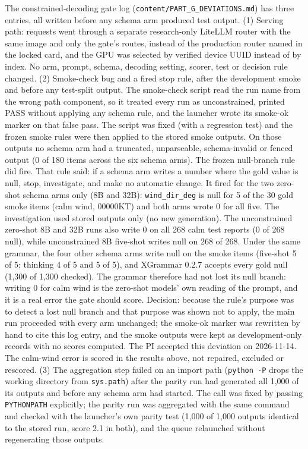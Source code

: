 \documentclass[11pt]{article}
\begin{document}
The constrained-decoding gate log (\texttt{content/PART\_G\_DEVIATIONS.md}) has three entries, all written before any
schema arm produced test output. (1) Serving path: requests went through a separate research-only LiteLLM router with
the same image and only the gate's routes, instead of the production router named in the locked card, and the GPU was
selected by verified device UUID instead of by index. No arm, prompt, schema, decoding setting, scorer, test or
decision rule changed.
(2) Smoke-check bug and a fired stop rule, after the development smoke and before any test-split output. The
smoke-check script read the run name from the wrong path component, so it treated every run as unconstrained, printed
PASS without applying any schema rule, and the launcher wrote its smoke-ok marker on that false pass. The script was
fixed (with a regression test) and the frozen smoke rules were then applied to the stored smoke outputs. On those
outputs no schema arm had a truncated, unparseable, schema-invalid or fenced output (0 of 180 items across the six
schema arms). The frozen null-branch rule did fire. That rule said: if a schema arm writes a number where the gold
value is null, stop, investigate, and make no automatic change. It fired for the two zero-shot schema arms only
(8B and 32B): \texttt{wind\_dir\_deg} is null for 5 of the 30 gold smoke items (calm wind, 00000KT) and both arms wrote
0 for all five. The investigation used stored outputs only (no new generation). The unconstrained zero-shot 8B and
32B runs also write 0 on all 268 calm test reports (0 of 268 null), while unconstrained 8B five-shot writes null on
268 of 268. Under the same grammar, the four other schema arms write null on the smoke items (five-shot 5 of 5;
thinking 4 of 5 and 5 of 5), and XGrammar 0.2.7 accepts every gold null (1,300 of 1,300 checked). The grammar
therefore had not lost its null branch: writing 0 for calm wind is the zero-shot models' own reading of the prompt,
and it is a real error the gate should score. Decision: because the rule's purpose was to detect a lost null branch
and that purpose was shown not to apply, the main run proceeded with every arm unchanged; the smoke-ok marker was
rewritten by hand to cite this log entry, and the smoke outputs were kept as development-only records with no scores
computed. The PI accepted this deviation on 2026-11-14. The calm-wind error is scored in the results above, not
repaired, excluded or rescored.
(3) The aggregation step failed on an import path (\texttt{python -P} drops the working directory from
\texttt{sys.path}) after the parity run had generated all 1,000 of its outputs and before any schema arm had started.
The call was fixed by passing \texttt{PYTHONPATH} explicitly; the parity run was aggregated with the same command
and checked with the launcher's own parity test (1,000 of 1,000 outputs identical to the stored run, score 2.1 in
both), and the queue relaunched without regenerating those outputs.
\end{document}
